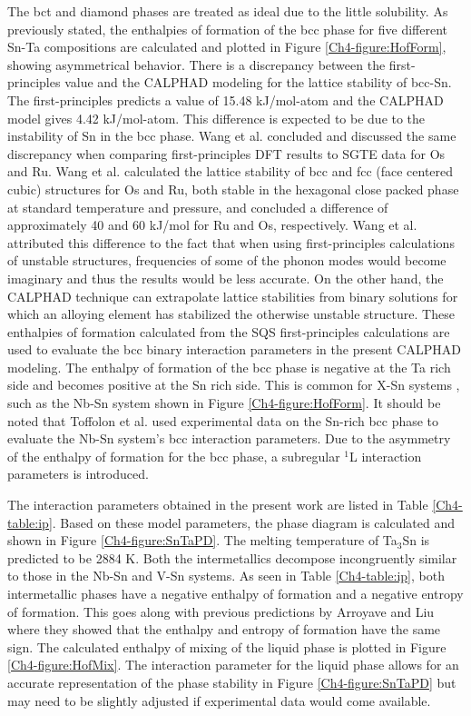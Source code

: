 The bct and diamond phases are treated as ideal due to the little solubility. As previously stated, the enthalpies of formation of the bcc phase for five different Sn-Ta compositions are calculated and plotted in Figure \ref{Ch4-figure:HofForm}, showing asymmetrical behavior. There is a discrepancy between the first-principles value and the CALPHAD modeling for the lattice stability of bcc-Sn. The first-principles predicts a value of 15.48 kJ/mol-atom and the CALPHAD model gives 4.42 kJ/mol-atom. This difference is expected to be due to the instability of Sn in the bcc phase. Wang et al. \cite{Wang2004a} concluded and discussed the same discrepancy when comparing first-principles DFT results to SGTE data for Os and Ru. Wang et al. \cite{Wang2004a} calculated the lattice stability of bcc and fcc (face centered cubic) structures for Os and Ru, both stable in the hexagonal close packed phase at standard temperature and pressure, and concluded a difference of approximately 40 and 60 kJ/mol for Ru and Os, respectively. Wang et al. \cite{Wang2004a} attributed this difference to the fact that when using first-principles calculations of unstable structures, frequencies of some of the phonon modes would become imaginary and thus the results would be less accurate. On the other hand, the CALPHAD technique can extrapolate lattice stabilities from binary solutions for which an alloying element has stabilized the otherwise unstable structure. These enthalpies of formation calculated from the SQS first-principles calculations are used to evaluate the bcc binary interaction parameters in the present CALPHAD modeling. The enthalpy of formation of the bcc phase is negative at the Ta rich side and becomes positive at the Sn rich side. This is common for X-Sn systems \cite{Yue2009,Toffolon2002}, such as the Nb-Sn system \cite{Toffolon2002} shown in Figure \ref{Ch4-figure:HofForm}. It should be noted that Toffolon et al. \cite{Toffolon1998,Toffolon2002} used experimental data on the Sn-rich bcc phase to evaluate the Nb-Sn system's bcc interaction parameters. Due to the asymmetry of the enthalpy of formation for the bcc phase, a subregular $^1$L interaction parameters is introduced. 

The interaction parameters obtained in the present work are listed in Table \ref{Ch4-table:ip}. Based on these model parameters, the phase diagram is calculated and shown in Figure \ref{Ch4-figure:SnTaPD}. The melting temperature of Ta$_3$Sn is predicted to be 2884 K. Both the intermetallics decompose incongruently similar to those in the Nb-Sn and V-Sn systems. As seen in Table \ref{Ch4-table:ip}, both intermetallic phases have a negative enthalpy of formation and a negative entropy of formation. This goes along with previous predictions by Arroyave and Liu \cite{Arroyave2006} where they showed that the enthalpy and entropy of formation have the same sign. The calculated enthalpy of mixing of the liquid phase is plotted in Figure \ref{Ch4-figure:HofMix}. The interaction parameter for the liquid phase allows for an accurate representation of the phase stability in Figure \ref{Ch4-figure:SnTaPD} but may need to be slightly adjusted if experimental data would come available.

